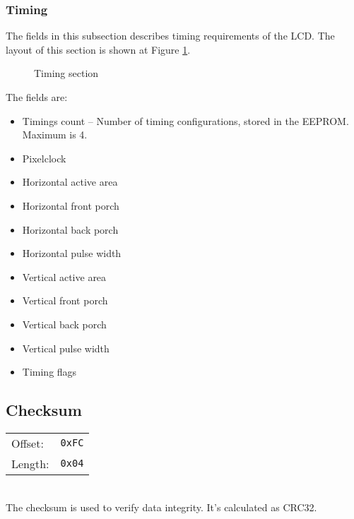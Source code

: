 \documentclass{article}
\newcommand{\regs}[2]{
	\begin{tabular}{l l}
		Offset: & \texttt{#1} \\
		Length: & \texttt{#2}
	\end{tabular} \\
	}
\begin{document}
			

		\subsubsection{Timing}
		The fields in this subsection describes timing requirements of the LCD. The layout of this section is shown at Figure \ref{fig:EEPROM_TIMINGS}.
		\begin{figure}[H]
			\centering
			
			\caption{Timing section}
			\label{fig:EEPROM_TIMINGS}
		\end{figure}
	
		The fields are:
		\begin{itemize}
			\item Timings count -- Number of timing configurations, stored in the EEPROM. Maximum is 4.
			\item Pixelclock
			\item Horizontal active area
			\item Horizontal front porch
			\item Horizontal back porch
			\item Horizontal pulse width
			\item Vertical active area
			\item Vertical front porch
			\item Vertical back porch
			\item Vertical pulse width
			\item Timing flags
		\end{itemize}
		
		

		
	\subsection{Checksum}
	\regs{0xFC}{0x04}
	
	The checksum is used to verify data integrity. It's calculated as CRC32.
\end{document}
